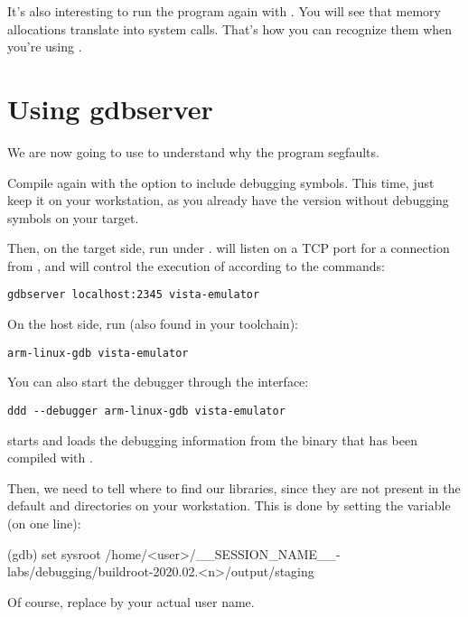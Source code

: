 It's also interesting to run the program again with . You
will see that memory allocations translate into  system
calls. That's how you can recognize them when you're using
.

\section{Using gdbserver}

We are now going to use  to understand why the program
segfaults.

Compile  again with the  option to
include debugging symbols. This time, just keep it on your workstation,
as you already have the version without debugging symbols on your target.

Then, on the target side, run  under
.  will listen on a TCP port for a
connection from , and will control the execution of
 according to the  commands:

\begin{verbatim}
gdbserver localhost:2345 vista-emulator
\end{verbatim}

On the host side, run  (also found in your toolchain):
\begin{verbatim}
arm-linux-gdb vista-emulator
\end{verbatim}

You can also start the debugger through the  interface:
\begin{verbatim}
ddd --debugger arm-linux-gdb vista-emulator
\end{verbatim}

 starts and loads the debugging information from the
 binary that has been compiled with .

Then, we need to tell where to find our libraries, since they are not
present in the default  and  directories on
your workstation. This is done by setting the  
variable (on one line):

\begin{ubootinput}
(gdb) set sysroot /home/<user>/__SESSION_NAME__-labs/debugging/buildroot-2020.02.<n>/output/staging
\end{ubootinput}

Of course, replace  by your actual user name.

